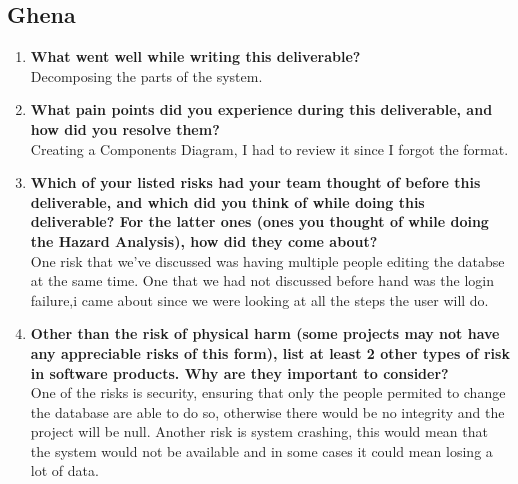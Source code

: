 \documentclass{article}
\begin{document}
\subsection*{Ghena}
\begin{enumerate}
    \item \textbf{What went well while writing this deliverable?}\\
    Decomposing the parts of the system.
    \item \textbf{What pain points did you experience during this deliverable, and how
    did you resolve them?}\\
    Creating a Components Diagram, I had to review it since I forgot the format.
    \item \textbf{Which of your listed risks had your team thought of before this
    deliverable, and which did you think of while doing this deliverable? For
    the latter ones (ones you thought of while doing the Hazard Analysis), how
    did they come about?}\\
    One risk that we've discussed was having multiple people editing the databse at the same time. One that we had not discussed before hand was the login failure,i came about since we were looking at all the steps the user will do. 
    \item \textbf{Other than the risk of physical harm (some projects may not have any
    appreciable risks of this form), list at least 2 other types of risk in
    software products. Why are they important to consider?} \\
    One of the risks is security, ensuring that only the people permited to change the database are able to do so,  otherwise there would be no integrity and the project will be null.
    Another risk is system crashing, this would mean that the system would not be available and in some cases it could mean losing a lot of data. 
  \end{enumerate}
\end{document}
